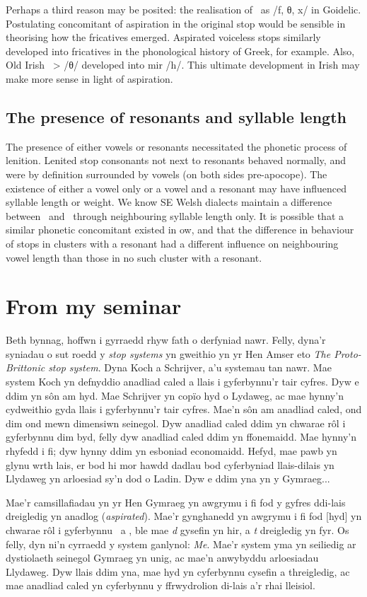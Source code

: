 Perhaps a third reason may be posited: the realisation of \lT\ as /f, θ, x/ in Goidelic. Postulating concomitant of aspiration in the original stop would be sensible in theorising how the fricatives emerged. Aspirated voiceless stops similarly developed into fricatives in the phonological history of Greek, for example. Also, Old Irish \lT\ > /θ/ developed into \gls{mir} /h/. This ultimate development in Irish may make more sense in light of aspiration.


\subsection{The presence of resonants and syllable length}
The presence of either vowels or resonants necessitated the phonetic process of lenition. Lenited stop consonants not next to resonants behaved normally, and were by definition surrounded by vowels (on both sides pre-apocope). The existence of either a vowel only or a vowel and a resonant may have influenced syllable length or weight. We know SE Welsh dialects maintain a difference between \xT\ and \xD\ through neighbouring syllable length only. It is possible that a similar phonetic concomitant existed in \gls{ow}, and that the difference in behaviour of stops in clusters with a resonant had a different influence on neighbouring vowel length than those in no such cluster with a resonant.

\section{From my seminar}
Beth bynnag, hoffwn i gyrraedd rhyw fath o derfyniad nawr. Felly, dyna'r syniadau o sut roedd y \textit{stop systems} yn gweithio yn yr Hen Amser eto \emph{The Proto-Brittonic stop system}. Dyna Koch a Schrijver, a'u systemau tan nawr. Mae system Koch yn defnyddio anadliad caled a llais i gyferbynnu'r tair cyfres. Dyw e ddim yn s\^on am hyd. Mae Schrijver yn cop\"io hyd o Lydaweg, ac mae hynny'n cydweithio gyda llais i gyferbynnu'r tair cyfres. Mae'n s\^on am anadliad caled, ond dim ond mewn dimensiwn seinegol. Dyw anadliad caled ddim yn chwarae r\^ol i gyferbynnu dim byd, felly dyw anadliad caled ddim yn ffonemaidd. Mae hynny'n rhyfedd i fi; dyw hynny ddim yn esboniad economaidd. Hefyd, mae pawb yn glynu wrth lais, er bod hi mor hawdd dadlau bod cyferbyniad llais-dilais yn Llydaweg yn arloesiad sy'n dod o Ladin. Dyw e ddim yna yn y Gymraeg...

Mae'r camsillafiadau yn yr Hen Gymraeg yn awgrymu i fi fod y gyfres ddi-lais dreigledig yn anadlog (\textit{aspirated}). Mae'r gynghanedd yn awgrymu i fi fod [hyd] yn chwarae r\^ol i gyferbynnu \xD\ a \lT, ble mae \textit{d} gysefin yn hir, a \textit{t} dreigledig yn fyr. Os felly, dyn ni'n cyrraedd y system ganlynol: \emph{Me}. Mae'r system yma yn seiliedig ar dystiolaeth seinegol Gymraeg yn unig, ac mae'n anwybyddu arloesiadau Llydaweg. Dyw llais ddim yna, mae hyd yn cyferbynnu cysefin a threigledig, ac mae anadliad caled yn cyferbynnu y ffrwydrolion di-lais a'r rhai lleisiol.

